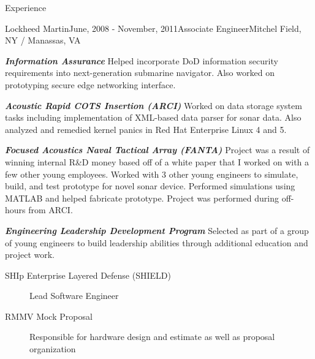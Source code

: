 \documentclass{resume} %
\begin{document}
\begin{rSection}{Experience}
\begin{rSubsection}{Lockheed Martin}{June, 2008 - November, 2011}{Associate Engineer}{Mitchel Field, NY / Manassas, VA}
\item \textbf{\textit{Information Assurance}} Helped incorporate DoD information security requirements into next-generation submarine navigator.  Also worked on prototyping secure edge networking interface.
\item \textbf{\textit{Acoustic Rapid COTS Insertion (ARCI)}} Worked on data storage system tasks including implementation of XML-based data parser for sonar data. Also analyzed and remedied kernel panics in Red Hat Enterprise Linux 4 and 5.
\item \textbf{\textit{Focused Acoustics Naval Tactical Array (FANTA)}} Project was a result of winning internal R\&D money based off of a white paper that I worked on with a few other young employees. Worked with 3 other young engineers to simulate, build, and test prototype for novel sonar device. Performed simulations using MATLAB and helped fabricate prototype. Project was performed during off-hours from ARCI.
\item \textbf{\textit{Engineering Leadership Development Program}} Selected as part of a group of young engineers to build leadership abilities through additional education and project work.
\begin{description}
\item[SHIp Enterprise Layered Defense (SHIELD)] Lead Software Engineer
\item[RMMV Mock Proposal] Responsible for hardware design and estimate as well as proposal organization
\end{description}
\end{rSubsection}

\end{rSection}

\end{document}
